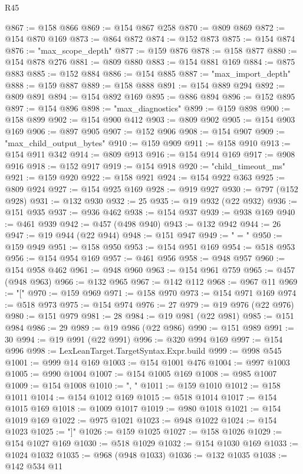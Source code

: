 \begin{lexlean}{R45}
\begin{coremodule}
@867 := @158 @866
@869 := @154 @867 @258
@870 := @809 @869
@872 := @154 @870 @169
@873 := @864 @872
@874 := @152 @873
@875 := @154 @874
@876 := "max_scope_depth"
@877 := @159 @876
@878 := @158 @877
@880 := @154 @878 @276
@881 := @809 @880
@883 := @154 @881 @169
@884 := @875 @883
@885 := @152 @884
@886 := @154 @885
@887 := "max_import_depth"
@888 := @159 @887
@889 := @158 @888
@891 := @154 @889 @294
@892 := @809 @891
@894 := @154 @892 @169
@895 := @886 @894
@896 := @152 @895
@897 := @154 @896
@898 := "max_diagnostics"
@899 := @159 @898
@900 := @158 @899
@902 := @154 @900 @412
@903 := @809 @902
@905 := @154 @903 @169
@906 := @897 @905
@907 := @152 @906
@908 := @154 @907
@909 := "max_child_output_bytes"
@910 := @159 @909
@911 := @158 @910
@913 := @154 @911 @342
@914 := @809 @913
@916 := @154 @914 @169
@917 := @908 @916
@918 := @152 @917
@919 := @154 @918
@920 := "child_timeout_ms"
@921 := @159 @920
@922 := @158 @921
@924 := @154 @922 @363
@925 := @809 @924
@927 := @154 @925 @169
@928 := @919 @927
@930 := @797 (@152 @928)
@931 := @132 @930
@932 := 25
@935 := @19 @932 (@22 @932)
@936 := @151 @935
@937 := @936 @462
@938 := @154 @937
@939 := @938 @169
@940 := @461 @939
@942 := @457 (@498 @940)
@943 := @132 @942
@944 := 26
@947 := @19 @944 (@22 @944)
@948 := @151 @947
@949 := " = "
@950 := @159 @949
@951 := @158 @950
@953 := @154 @951 @169
@954 := @518 @953
@956 := @154 @954 @169
@957 := @461 @956
@958 := @948 @957
@960 := @154 @958 @462
@961 := @948 @960
@963 := @154 @961 @759
@965 := @457 (@948 @963)
@966 := @132 @965
@967 := @142 @112
@968 := @967 @11
@969 := "["
@970 := @159 @969
@971 := @158 @970
@973 := @154 @971 @169
@974 := @518 @973
@975 := @154 @974
@976 := 27
@979 := @19 @976 (@22 @976)
@980 := @151 @979
@981 := 28
@984 := @19 @981 (@22 @981)
@985 := @151 @984
@986 := 29
@989 := @19 @986 (@22 @986)
@990 := @151 @989
@991 := 30
@994 := @19 @991 (@22 @991)
@996 := @320 @994 @169
@997 := @154 @996
@998 := LexLeanTarget.TargetSyntax.Expr.build
@999 := @998 @545
@1001 := @999 @14 @169
@1003 := @154 @1001 @476
@1004 := @997 @1003
@1005 := @990 @1004
@1007 := @154 @1005 @169
@1008 := @985 @1007
@1009 := @154 @1008
@1010 := ", "
@1011 := @159 @1010
@1012 := @158 @1011
@1014 := @154 @1012 @169
@1015 := @518 @1014
@1017 := @154 @1015 @169
@1018 := @1009 @1017
@1019 := @980 @1018
@1021 := @154 @1019 @169
@1022 := @975 @1021
@1023 := @948 @1022
@1024 := @154 @1023
@1025 := "]"
@1026 := @159 @1025
@1027 := @158 @1026
@1029 := @154 @1027 @169
@1030 := @518 @1029
@1032 := @154 @1030 @169
@1033 := @1024 @1032
@1035 := @968 (@948 @1033)
@1036 := @132 @1035
@1038 := @142 @534 @11

\end{coremodule}
\end{lexlean}
